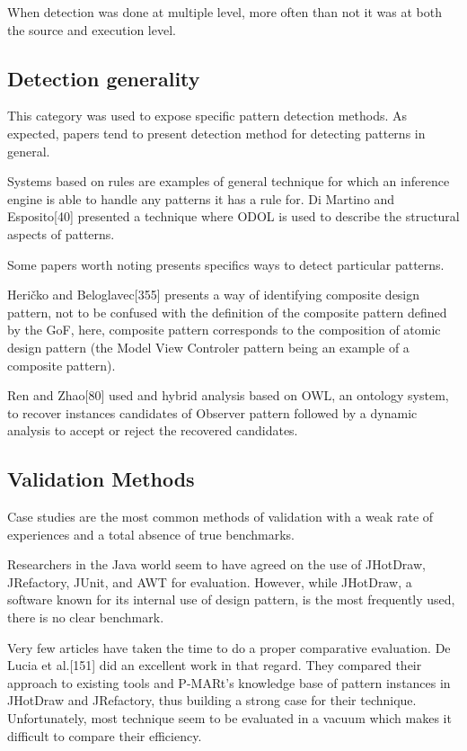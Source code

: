 \documentclass[letterpaper, 10 pt, conference]{ieeeconf}  %
\begin{document}
When detection was done at multiple level, more often than not it was at both
the source and execution level.



\subsection{Detection generality}

This category was used to expose specific pattern detection methods.
As expected, papers tend to present detection method for detecting patterns
in general.

Systems based on rules are examples of general technique for which 
an inference engine is able to handle any patterns it has a rule for.
Di Martino and Esposito[40] presented a technique where ODOL is used
to describe the structural aspects of patterns.

Some papers worth noting presents specifics ways to detect particular patterns.

Heričko and Beloglavec[355] presents a way of identifying
composite design pattern, not to be confused with the definition of the 
composite pattern defined by the GoF, here, composite pattern corresponds to the
composition of atomic design pattern (the Model View Controler pattern being an
example of a composite pattern).

Ren and Zhao[80] used and hybrid analysis based on OWL, an ontology system,
to recover instances candidates of Observer pattern followed by a dynamic
analysis to accept or reject the recovered candidates.


\subsection{Validation Methods}

Case studies are the most common methods of validation with a weak rate of
experiences and a total absence of true benchmarks.

Researchers in the Java world seem to have agreed on the use of JHotDraw,
JRefactory, JUnit, and AWT for evaluation.
However, while JHotDraw, a software known for its internal use of design
pattern, is the most frequently used, there is no clear benchmark.

Very few articles have taken the time to do a proper comparative evaluation.
De Lucia et al.[151] did an excellent work in that regard.
They compared their approach to existing tools and P-MARt's knowledge base
of pattern instances in JHotDraw and JRefactory, thus building a
strong case for their technique.
Unfortunately, most technique seem to be evaluated in a vacuum which makes it
difficult to compare their efficiency.
\end{document}
